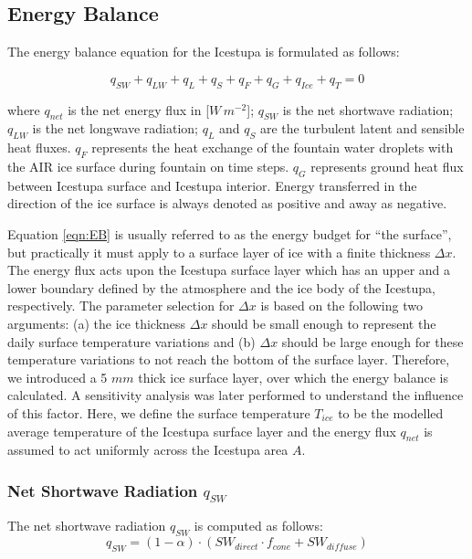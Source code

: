 \documentclass[utf8]{frontiersSCNS} %
\begin{document}
\subsection{Energy Balance} \label{section:EB}

The energy balance equation \citep{Hock_2005} for the Icestupa is formulated as follows:

\begin{equation} q_{SW} + q_{LW} + q_{L} + q_{S} + q_{F} + q_{G} + q_{Ice} +  q_{T} = 0 \label{eqn:EB} \end{equation}

where $q_{net}$ is the net energy flux in [$W\,m^{-2}$]; $q_{SW}$ is the net shortwave radiation; $q_{LW}$ is the net
longwave radiation; $q_{L}$ and $q_{S}$ are the turbulent latent and sensible heat fluxes. $q_{F}$ represents the heat
exchange of the fountain water droplets with the AIR ice surface during fountain on time steps. $q_{G}$
represents ground heat flux between Icestupa surface and Icestupa interior. Energy transferred in the direction of the
ice surface is always denoted as positive and away as negative.  

Equation \ref{eqn:EB} is usually referred to as the energy budget for “the surface”, but practically it must apply to
a surface layer of ice with a finite thickness $\Delta x$. The energy flux acts upon the Icestupa surface layer which
has an upper and a lower boundary defined by the atmosphere and the ice body of the Icestupa, respectively. The
parameter selection for $\Delta x$ is based on the following two arguments: (a) the ice thickness $\Delta x$ should be
small enough to represent the daily surface temperature variations and (b) $\Delta x$ should be large enough for these
temperature variations to not reach the bottom of the surface layer.  Therefore, we introduced a 5 $mm$ thick ice
surface layer, over which the energy balance is calculated. A sensitivity analysis was later performed to understand
the influence of this factor. Here, we define the surface temperature $T_{ice}$ to be the modelled average temperature
of the Icestupa surface layer and the energy flux $q_{net}$ is assumed to act uniformly across the Icestupa area $A$.

\subsubsection{Net Shortwave Radiation \texorpdfstring{$q_{SW}$}{Lg}} The net shortwave radiation $q_{SW}$ is computed as follows:
\begin{equation} q_{SW} = (1- \alpha)\cdot (SW_{direct} \cdot f_{cone} + SW_{diffuse}) \label{eqn:SW} \end{equation}
\end{document}
